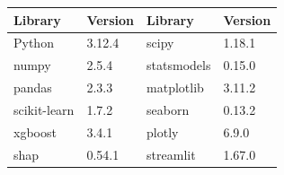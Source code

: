 \footnotesize
\setlength{\tabcolsep}{3pt}
\begin{tabular}{llll}
\toprule
Library & Version & Library & Version \\
\midrule
Python & 3.12.4 & scipy & 1.18.1 \\
numpy & 2.5.4 & statsmodels & 0.15.0 \\
pandas & 2.3.3 & matplotlib & 3.11.2 \\
scikit-learn & 1.7.2 & seaborn & 0.13.2 \\
xgboost & 3.4.1 & plotly & 6.9.0 \\
shap & 0.54.1 & streamlit & 1.67.0 \\
\bottomrule
\end{tabular}
